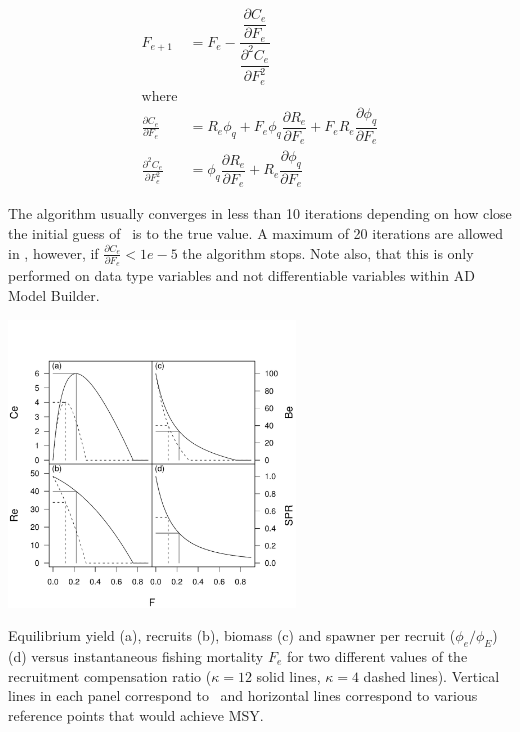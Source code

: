 \begin{multicols}{2}
\begin{align}\label{eq1.1}
    F_{e+1}&=F_e - 
    \dfrac{ \dfrac{\partial C_e}{\partial F_e}}
    { \dfrac{\partial^2 C_e}{\partial F_e^2}}\\
    \mbox{where}\nonumber\\
     \frac{\partial C_e}{\partial F_e} &=
    R_e \phi_q
    + F_e \phi_q \dfrac{\partial R_e}{\partial F_e}
    + F_e R_e \dfrac{\partial \phi_q}{\partial F_e} \nonumber\\
    \frac{\partial^2 C_e}{\partial F_e^2} &=
    \phi_q \dfrac{\partial R_e}{\partial F_e}
   +  R_e \dfrac{\partial \phi_q}{\partial F_e}\nonumber
\end{align}

The algorithm usually converges in less than 10 iterations depending on how close the initial guess of \fmsy\ is to the true value.  A maximum of 20 iterations are allowed in \iscam, however, if $\frac{\partial C_e}{\partial F_e}<1e-5$ the algorithm stops.  Note also, that this is only performed on data type variables and not differentiable variables within AD Model Builder.
 

\begin{figurehere}
    \centering
        \includegraphics[height=3in]{iscamFigs/Fig1Quadplot.pdf}
    \caption{Equilibrium yield (a), recruits (b), biomass (c) and
       spawner per recruit ($\phi_e/\phi_E$) (d) versus instantaneous
       fishing mortality $F_e$ for two different values of the recruitment
       compensation ratio ($\kappa=12$ solid lines, $\kappa=4$ dashed
       lines). Vertical lines in each panel correspond to \fmsy\ and
       horizontal lines correspond to various reference points that would
       achieve MSY.}
    \label{fig:iscamFigs_Fig1Quadplot}
\end{figurehere}


\end{multicols}
